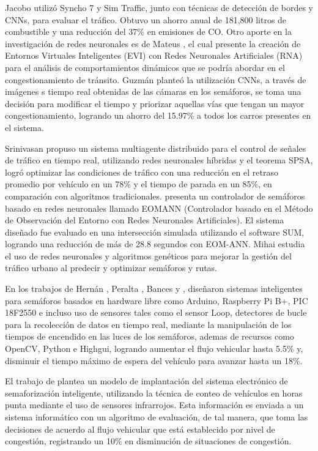 \documentclass[conference]{IEEEtran}
\begin{document}
Jacobo \cite{Jacobo2015} utilizó Syncho 7 y Sim Traffic, junto con técnicas de detección de bordes y CNNs, para evaluar el tráfico. Obtuvo un ahorro anual de 181,800 litros de combustible y una reducción del 37\% en emisiones de CO. Otro aporte en la investigación de redes neuronales es de Mateus \cite{Mateus2014}, el cual presente la creación de Entornos Virtuales Inteligentes (EVI) con Redes Neuronales Artificiales (RNA) para el análisis de comportamientos dinámicos que se podría abordar en el congestionamiento de tránsito. Guzmán \cite{Felipe2022} planteó la utilización CNNs, a través de imágenes s tiempo real obtenidas de las cámaras en los semáforos, se toma una decisión para modificar el tiempo y priorizar aquellas vías que tengan un mayor congestionamiento, logrando un ahorro del 15.97\% a todos los carros presentes en el sistema.

Srinivasan\cite{Srinivasan2006} propuso un sistema multiagente distribuido para el control de señales de tráfico en tiempo real, utilizando redes neuronales híbridas y el teorema SPSA, logró optimizar las condiciones de tráfico con una reducción en el retraso promedio por vehículo en un 78\% y el tiempo de parada en un 85\%, en comparación con algoritmos tradicionales. \cite{Michel2013} presenta un controlador de semáforos basado en redes neuronales llamado EOMANN (Controlador basado en el Método de Observación del Entorno con Redes Neuronales Artificiales). El sistema diseñado fue evaluado en una intersección simulada utilizando el software SUM, logrando una reducción de más de 28.8 segundos con EOM-ANN. Mihai \cite{Lungu2024} estudia el uso de redes neuronales y algoritmos genéticos para mejorar la gestión del tráfico urbano al predecir y optimizar semáforos y rutas. 

 En los trabajos de Hernán , Peralta \cite{Peralta2017}, Bances \cite{Bances2014} y \cite{Jose2016}, diseñaron sistemas inteligentes para semáforos basados en hardware libre como Arduino, Raspberry Pi B+, PIC 18F2550 e incluso uso de sensores tales como el sensor Loop, detectores de  bucle para la recolección de datos en tiempo real, mediante la manipulación de los tiempos de encendido en las luces de los semáforos, ademas de recursos como OpenCV, Python e Highgui, logrando aumentar el flujo vehicular hasta 5.5\% y, disminuir el tiempo máximo de espera del vehículo para avanzar hasta un 18\%.

El trabajo de \cite{Arquimedes2019} plantea un modelo de implantación del sistema electrónico de semaforización inteligente, utilizando la técnica de conteo de vehículos en horas punta mediante el uso de sensores infrarrojos. Esta información es enviada a un sistema informático con un algoritmo de evaluación, de tal manera, que toma las decisiones de acuerdo al flujo vehicular que está establecido por nivel de congestión, registrando un 10\% en disminución de situaciones de congestión.
\end{document}
